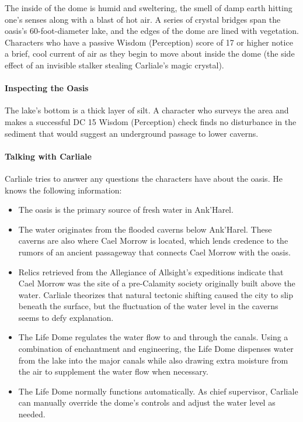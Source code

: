 \documentclass[10pt,a4paper,twoside,twocolumn,openany,nodeprecatedcode]{dndbook}
\begin{document}
The inside of the dome is humid and sweltering, the smell of damp earth hitting one's senses along with a blast of hot air. A series of crystal bridges span the oasis's 60-foot-diameter lake, and the edges of the dome are lined with vegetation. Characters who have a passive Wisdom (Perception) score of 17 or higher notice a brief, cool current of air as they begin to move about inside the dome (the side effect of an invisible stalker stealing Carliale's magic crystal).

\paragraph{Inspecting the Oasis}
The lake's bottom is a thick layer of silt. A character who surveys the area and makes a successful DC 15 Wisdom (Perception) check finds no disturbance in the sediment that would suggest an underground passage to lower caverns.

\paragraph{Talking with Carliale}
Carliale tries to answer any questions the characters have about the oasis. He knows the following information:


\begin{itemize}
\item The oasis is the primary source of fresh water in Ank'Harel.
\item The water originates from the flooded caverns below Ank'Harel. These caverns are also where Cael Morrow is located, which lends credence to the rumors of an ancient passageway that connects Cael Morrow with the oasis.
\item Relics retrieved from the Allegiance of Allsight's expeditions indicate that Cael Morrow was the site of a pre-Calamity society originally built above the water. Carliale theorizes that natural tectonic shifting caused the city to slip beneath the surface, but the fluctuation of the water level in the caverns seems to defy explanation.
\item The Life Dome regulates the water flow to and through the canals. Using a combination of enchantment and engineering, the Life Dome dispenses water from the lake into the major canals while also drawing extra moisture from the air to supplement the water flow when necessary.
\item The Life Dome normally functions automatically. As chief supervisor, Carliale can manually override the dome's controls and adjust the water level as needed.
\end{itemize}
\end{document}
